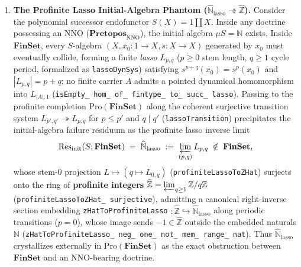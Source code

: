 \begin{enumerate}

  \item \textbf{The Profinite Lasso Initial-Algebra Phantom ($\widehat{\mathbb{N}}_{\mathrm{lasso}} \twoheadrightarrow \widehat{\mathbb{Z}}$).} Consider the polynomial successor endofunctor $S(X) = 1 \amalg X$. Inside any doctrine possessing an $\mathrm{NNO}$ ($\mathbf{Pretopos}_{\mathrm{NNO}}$), the initial algebra $\mu S = \mathbb{N}$ exists. Inside $\mathbf{FinSet}$, every $S$-algebra $(X, x_0 : 1 \to X, s : X \to X)$ generated by $x_0$ must eventually collide, forming a finite \emph{lasso} $L_{p,q}$ ($p \ge 0$ stem length, $q \ge 1$ cycle period, formalized as \texttt{lassoDynSys}) satisfying $s^{p+q}(x_0) = s^p(x_0)$ and $|L_{p,q}| = p + q$; no finite carrier $A$ admits a pointed dynamical homomorphism into $L_{|A|, 1}$ (\texttt{isEmpty\_ hom\_ of\_ fintype\_ to\_ succ\_ lasso}). Passing to the profinite completion $\mathrm{Pro}(\mathbf{FinSet})$ along the coherent surjective transition system $L_{p', q'} \twoheadrightarrow L_{p, q}$ for $p \le p'$ and $q \mid q'$ (\texttt{lassoTransition}) precipitates the initial-algebra failure residuum as the profinite lasso inverse limit
  \[
    \mathrm{Res}_{\mathrm{init}}(S; \mathbf{FinSet}) \;=\; \widehat{\mathbb{N}}_{\mathrm{lasso}} \;:=\; \varprojlim_{(p,q)} L_{p,q} \;\notin\; \mathbf{FinSet},
  \]
  whose stem-$0$ projection $L \mapsto (q \mapsto L_{0, q})$ (\texttt{profiniteLassoToZHat}) surjects onto the ring of \textbf{profinite integers} $\widehat{\mathbb{Z}} = \varprojlim_{q \ge 1} \mathbb{Z}/q\mathbb{Z}$ (\texttt{profiniteLassoToZHat\_ surjective}), admitting a canonical right-inverse section embedding \texttt{zHatToProfiniteLasso} $\colon \widehat{\mathbb{Z}} \hookrightarrow \widehat{\mathbb{N}}_{\mathrm{lasso}}$ along periodic transitions ($p = 0$), whose image sends $-1 \in \widehat{\mathbb{Z}}$ outside the embedded naturals $\mathbb{N}$ (\texttt{zHatToProfiniteLasso\_ neg\_ one\_ not\_ mem\_ range\_ nat}). Thus $\widehat{\mathbb{N}}_{\mathrm{lasso}}$ crystallizes externally in $\mathrm{Pro}(\mathbf{FinSet})$ as the exact obstruction between $\mathbf{FinSet}$ and an $\mathrm{NNO}$-bearing doctrine.


\end{enumerate}

